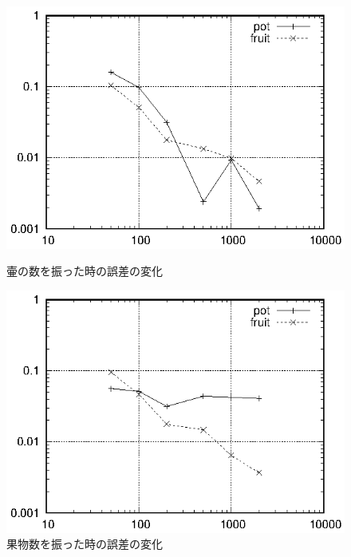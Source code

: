\documentclass[a4j]{jarticle}
\begin{document}
\begin{figure}[tbp]
 \begin{minipage}{0.5\hsize}
  \begin{center}
   \includegraphics[width=\hsize]{fig/punch_pot.eps}
  \end{center}
  \caption{壷の数を振った時の誤差の変化}
  \label{fig:punch_pot}
 \end{minipage}
 \begin{minipage}{0.5\hsize}
  \begin{center}
   \includegraphics[width=\hsize]{fig/punch_fruit.eps}
  \end{center}
  \caption{果物数を振った時の誤差の変化}
  \label{fig:punch_fruit}
 \end{minipage}
\end{figure}
\end{document}
